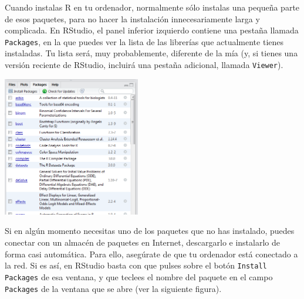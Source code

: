\documentclass[10pt,a4paper]{article}\usepackage[]{graphicx}\usepackage[]{color}
\newcounter {cont01}
\begin{document}
Cuando instalas  R en tu ordenador, normalmente sólo instalas una pequeña parte de esos paquetes, para no hacer la instalación innecesariamente larga y complicada. En RStudio, el panel inferior izquierdo contiene una pestaña llamada {\tt Packages}, en la que puedes ver la lista de las librerías que actualmente tienes instaladas. Tu lista será, muy probablemente, diferente de la mía (y, si tienes una versión reciente de RStudio, incluirá una pestaña adicional, llamada {\tt Viewer}).
    \begin{center}
    \includegraphics[width=6cm]{../fig/Tut05-10.png}
    \end{center}
Si en algún momento necesitas uno de los paquetes  que no has instalado, puedes conectar con un almacén de paquetes en Internet, descargarlo e instalarlo de forma casi automática. Para ello, asegúrate de que tu ordenador está conectado a la red. Si es así, en RStudio basta con que pulses sobre el botón {\tt Install Packages} de esa ventana, y que teclees el nombre del paquete en el campo {\tt Packages} de la ventana que se abre (ver la siguiente figura).
\end{document}
